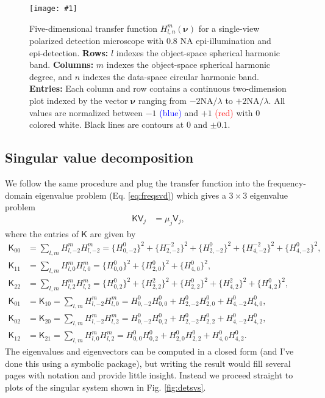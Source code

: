 \documentclass[11pt]{article}
\providecommand{\bs}[1]{\boldsymbol{#1}}
\providecommand{\fig}[4]{
\begin{figure}[h]
 \captionsetup{width=1.0\linewidth}
 \centering
 \texttt{[image: \#1]}
 \caption{#3}
 \label{fig:#4}
\end{figure}
}
\begin{document}
\fig{../calculations/out/Hdet.pdf}{1.0}{Five-dimensional transfer function
  $H_{l,n}^m(\bs{\nu})$ for a single-view polarized detection microscope with
  0.8 NA epi-illumination and epi-detection. \textbf{Rows:} $l$ indexes the
  object-space spherical harmonic band. \textbf{Columns:} $m$ indexes the
  object-space spherical harmonic degree, and $n$ indexes the data-space
  circular harmonic band. \textbf{Entries:} Each column and row contains a
  continuous two-dimension plot indexed by the vector $\bs{\nu}$ ranging from
  $-2\text{NA}/\lambda$ to $+2\text{NA}/\lambda$. All values are normalized
  between $-1$ \textcolor{blue}{(blue)} and $+1$ \textcolor{red}{(red)} with $0$
  colored white. Black lines are contours at 0 and $\pm 0.1$.}{dettran}


\subsection{Singular value decomposition}
We follow the same procedure and plug the transfer function into the
frequency-domain eigenvalue problem (Eq. \ref{eq:freqsvd}) which gives a
$3\times 3$ eigenvalue problem
\begin{align}
  \mathsf{K}\mathsf{V}_j &= \mu_{j}\mathsf{V}_j,
\end{align}
where the entries of $\mathsf{K}$ are given by
\begin{align}
  \mathsf{K}_{00} &= \sum_{l,m}H_{l,-2}^{m}H_{l,-2}^{m} = \{H_{0,-2}^{0}\}^2 + \{H_{2,-2}^{-2}\}^2 + \{H_{2,-2}^{0}\}^2 + \{H_{4,-2}^{-2}\}^2 + \{H_{4,-2}^{0}\}^2,\\
  \mathsf{K}_{11} &= \sum_{l,m}H_{l,0}^{m}H_{l,0}^{m} = \{H_{0,0}^{0}\}^2 + \{H_{2,0}^{0}\}^2 + \{H_{4,0}^{0}\}^2,\\
  \mathsf{K}_{22} &= \sum_{l,m}H_{l,2}^{m}H_{l,2}^{m} = \{H_{0,2}^{0}\}^2 + \{H_{2,2}^{2}\}^2 + \{H_{2,2}^{0}\}^2 + \{H_{4,2}^{2}\}^2 + \{H_{4,2}^{0}\}^2,\\
  \mathsf{K}_{01} &= \mathsf{K}_{10} = \sum_{l,m}H_{l,-2}^{m}H_{l,0}^{m} = H_{0,-2}^{0}H_{0,0}^{0} + H_{2,-2}^{0}H_{2,0}^{0} + H_{4,-2}^{0}H_{4,0}^{0},\\
  \mathsf{K}_{02} &= \mathsf{K}_{20} = \sum_{l,m}H_{l,-2}^{m}H_{l,2}^{m} = H_{0,-2}^{0}H_{0,2}^{0} + H_{2,-2}^{0}H_{2,2}^{0} + H_{4,-2}^{0}H_{4,2}^{0},\\
  \mathsf{K}_{12} &= \mathsf{K}_{21} = \sum_{l,m}H_{l,0}^{m}H_{l,2}^{m} = H_{0,0}^{0}H_{0,2}^{0} + H_{2,0}^{0}H_{2,2}^{0} + H_{4,0}^{0}H_{4,2}^{0}.
\end{align}
The eigenvalues and eigenvectors can be computed in a closed form (and I've done
this using a symbolic package), but writing the result would fill several pages
with notation and provide little insight. Instead we proceed straight to plots
of the singular system shown in Fig. \ref{fig:detsvs}.
\end{document}
